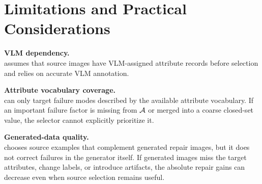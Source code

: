 \section{Limitations and Practical Considerations}
\label{app:limitations}

\textbf{VLM dependency.}\\
\model assumes that source images have VLM-assigned attribute records before selection and relies on accurate VLM annotation.

\vspace{0.5em}
\textbf{Attribute vocabulary coverage.}\\
\model can only target failure modes described by the available attribute vocabulary. If an important failure factor is missing from $\mathcal{A}$ or merged into a coarse closed-set value, the selector cannot explicitly prioritize it.

\vspace{0.5em}
\textbf{Generated-data quality.}\\
\model chooses source examples that complement generated repair images, but it does not correct failures in the generator itself. If generated images miss the target attributes, change labels, or introduce artifacts, the absolute repair gains can decrease even when source selection remains useful.

\clearpage
